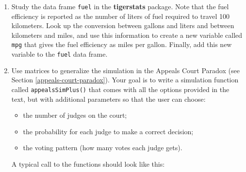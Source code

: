 \documentclass[]{book}
\makeatletter
\newenvironment{Shaded}{\begin{snugshade}}{\end{snugshade}}
\newcommand{\KeywordTok}[1]{\textcolor[rgb]{0.13,0.29,0.53}{\textbf{#1}}}
\newcommand{\DataTypeTok}[1]{\textcolor[rgb]{0.13,0.29,0.53}{#1}}
\newcommand{\StringTok}[1]{\textcolor[rgb]{0.31,0.60,0.02}{#1}}
\newcommand{\NormalTok}[1]{#1}
\providecommand{\tightlist}{%
  \setlength{\itemsep}{0pt}\setlength{\parskip}{0pt}}
\newenvironment{kframe}{%
\medskip{}
\setlength{\fboxsep}{.8em}
 \def\at@end@of@kframe{}%
 \ifinner\ifhmode%
  \def\at@end@of@kframe{\end{minipage}}%
  \begin{minipage}{\columnwidth}%
 \fi\fi%
 \def\FrameCommand##1{\hskip\@totalleftmargin \hskip-\fboxsep
 \colorbox{shadecolor}{##1}\hskip-\fboxsep
     \hskip-\linewidth \hskip-\@totalleftmargin \hskip\columnwidth}%
 \MakeFramed {\advance\hsize-\width
   \@totalleftmargin\z@ \linewidth\hsize
   \@setminipage}}%
 {\par\unskip\endMakeFramed%
 \at@end@of@kframe}
\renewenvironment{Shaded}{\begin{kframe}}{\end{kframe}}
\theoremstyle{definition}
\theoremstyle{definition}
\theoremstyle{definition}
\theoremstyle{remark}
\makeatother
\begin{document}
{\begin{enumerate}
  \textbf{Hint}: If you have a vector of three letters, such as

\begin{Shaded}
\begin{Highlighting}[]
\NormalTok{vec <-}\StringTok{ }\KeywordTok{c}\NormalTok{(}\StringTok{"g"}\NormalTok{, }\StringTok{"a"}\NormalTok{, }\StringTok{"r"}\NormalTok{)}
\end{Highlighting}
\end{Shaded}

  then you can paste them together as follows:

\begin{Shaded}
\begin{Highlighting}[]
\KeywordTok{paste0}\NormalTok{(vec, }\DataTypeTok{collapse =} \StringTok{""}\NormalTok{)}
\end{Highlighting}
\end{Shaded}

\begin{verbatim}
## [1] "gar"
\end{verbatim}
\item
  Study the data frame \texttt{fuel} in the \textbf{tigerstats} package.
  Note that the fuel efficiency is reported as the number of liters of
  fuel required to travel 100 kilometers. Look up the conversion between
  gallons and liters and between kilometers and miles, and use this
  information to create a new variable called \texttt{mpg} that gives
  the fuel efficiency as miles per gallon. Finally, add this new
  variable to the \texttt{fuel} data frame.
\item
  Use matrices to generalize the simulation in the Appeals Court Paradox
  (see Section \ref{appeals-court-paradox}). Your goal is to write a
  simulation function called \texttt{appealsSimPlus()} that comes with
  all the options provided in the text, but with additional parameters
  so that the user can choose:

  \begin{itemize}
  \tightlist
  \item
    the number of judges on the court;
  \item
    the probability for each judge to make a correct decision;
  \item
    the voting pattern (how many votes each judge gets).
  \end{itemize}

  A typical call to the functions should look like this:


\end{enumerate}}
\end{document}
